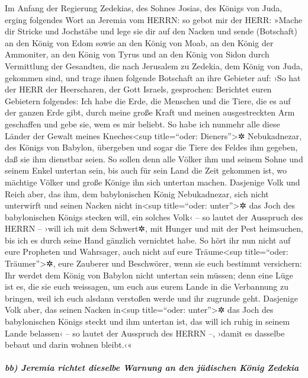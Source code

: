 Im Anfang der Regierung Zedekias, des Sohnes Josias, des
Königs von Juda, erging folgendes Wort an Jeremia vom HERRN:
so gebot mir der HERR: »Mache dir Stricke und Jochstäbe
und lege sie dir auf den Nacken und sende (Botschaft) an
den König von Edom sowie an den König von Moab, an den König der
Ammoniter, an den König von Tyrus und an den König von Sidon durch
Vermittlung der Gesandten, die nach Jerusalem zu Zedekia, dem König von
Juda, gekommen sind, und trage ihnen folgende Botschaft an
ihre Gebieter auf: ›So hat der HERR der Heerscharen, der Gott Israels,
gesprochen: Berichtet euren Gebietern folgendes: Ich habe
die Erde, die Menschen und die Tiere, die es auf der ganzen Erde gibt,
durch meine große Kraft und meinen ausgestreckten Arm geschaffen und
gebe sie, wem es mir beliebt. So habe ich nunmehr alle
diese Länder der Gewalt meines Kneches\textless sup title=``oder:
Dieners''\textgreater✲ Nebukadnezar, des Königs von Babylon, übergeben
und sogar die Tiere des Feldes ihm gegeben, daß sie ihm dienstbar seien.
So sollen denn alle Völker ihm und seinem Sohne und seinem
Enkel untertan sein, bis auch für sein Land die Zeit gekommen ist, wo
mächtige Völker und große Könige ihn sich untertan machen.
Dasjenige Volk und Reich aber, das ihm, dem babylonischen
König Nebukadnezar, sich nicht unterwirft und seinen Nacken nicht
in\textless sup title=``oder: unter''\textgreater✲ das Joch des
babylonischen Königs stecken will, ein solches Volk‹ -- so lautet der
Ausspruch des HERRN -- ›will ich mit dem Schwert✲, mit Hunger und mit
der Pest heimsuchen, bis ich es durch seine Hand gänzlich vernichtet
habe. So hört ihr nun nicht auf eure Propheten und
Wahrsager, auch nicht auf eure Träume\textless sup title=``oder:
Träumer''\textgreater✲, eure Zauberer und Beschwörer, wenn sie euch
bestimmt versichern: Ihr werdet dem König von Babylon nicht untertan
sein müssen; denn eine Lüge ist es, die sie euch
weissagen, um euch aus eurem Lande in die Verbannung zu bringen, weil
ich euch alsdann verstoßen werde und ihr zugrunde geht.
Dasjenige Volk aber, das seinen Nacken in\textless sup
title=``oder: unter''\textgreater✲ das Joch des babylonischen Königs
steckt und ihm untertan ist, das will ich ruhig in seinem Lande
belassen‹ -- so lautet der Ausspruch des HERRN --, ›damit es dasselbe
bebaut und darin wohnen bleibt.‹«

\hypertarget{bb-jeremia-richtet-dieselbe-warnung-an-den-juxfcdischen-kuxf6nig-zedekia}{%
\subparagraph{bb) Jeremia richtet dieselbe Warnung an den jüdischen
König
Zedekia}\label{bb-jeremia-richtet-dieselbe-warnung-an-den-juxfcdischen-kuxf6nig-zedekia}}

